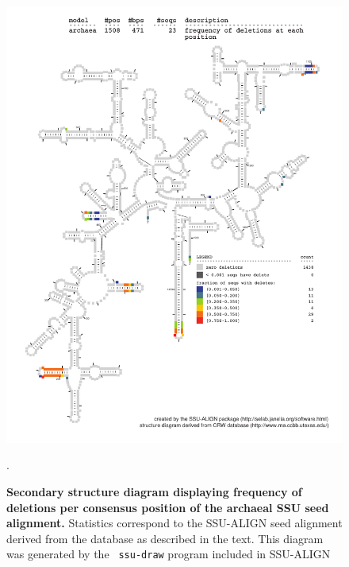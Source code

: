 \begin{figure}
\begin{center}
\includegraphics[width=5.64in]{Figures/archaea-0p1-dall}
\end{center}
\caption[Secondary structure diagram displaying frequency of deletions
  per consensus position of the archaeal SSU seed
  alignment]{\textbf{Secondary structure diagram displaying frequency 
  of deletions per consensus position of the archaeal SSU seed
  alignment.} Statistics correspond to the SSU-ALIGN seed
  alignment derived from the  database \cite{CannoneGutell02}
  as described in the text. This diagram was generated by the {\tt
  ssu-draw} program included in SSU-ALIGN}.
\label{fig:arcdel}
\end{figure}

\newpage 

